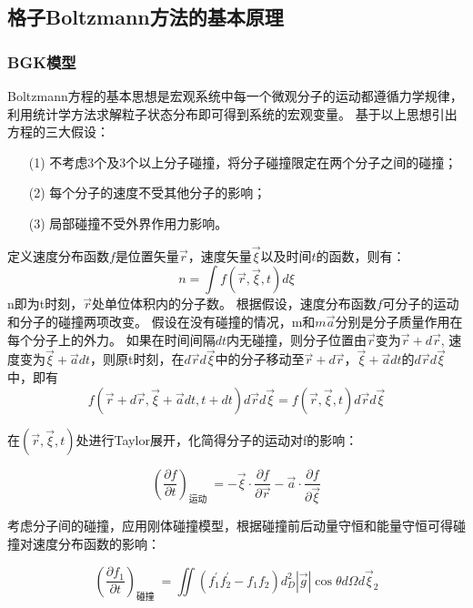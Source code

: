\subsection{格子Boltzmann方法的基本原理}

\subsubsection{BGK模型}
Boltzmann方程的基本思想是宏观系统中每一个微观分子的运动都遵循力学规律，
利用统计学方法求解粒子状态分布即可得到系统的宏观变量。
基于以上思想引出方程的三大假设：
\begin{itemize}
	\item[(1)] 不考虑3个及3个以上分子碰撞，将分子碰撞限定在两个分子之间的碰撞；
	\item[(2)] 每个分子的速度不受其他分子的影响；
	\item[(3)] 局部碰撞不受外界作用力影响。	
\end{itemize}

定义速度分布函数$f$是位置矢量$\vec{r}$，速度矢量$\vec{\xi}$以及时间$t$的函数，则有：
\begin{equation}n=\int f(\vec{r}, \vec{\xi}, t) d \xi\end{equation}
\noindent n即为t时刻，$\vec{r}$处单位体积内的分子数。
根据假设，速度分布函数$f$可分子的运动和分子的碰撞两项改变。
假设在没有碰撞的情况，m和$m \vec{a}$分别是分子质量作用在每个分子上的外力。
如果在时间间隔$d t$内无碰撞，则分子位置由$\vec{r}$变为$\vec{r}+d \vec{r}$,
速度变为$\vec{\xi}+\vec{a} d t$，则原t时刻，在$d \vec{r} d \vec{\xi}$中的分子移动至$\vec{r}+d \vec{r}$，$\vec{\xi}+\vec{a} d t$的$d \vec{r} d \vec{\xi}$中，即有
\begin{equation}f(\vec{r}+d \vec{r}, \vec{\xi}+\vec{a} d t, t+d t) d \vec{r} d \vec{\xi}=f(\vec{r}, \vec{\xi}, t) d \vec{r} d \vec{\xi}\end{equation}

\noindent 在$(\vec{r}, \vec{\xi}, t)$处进行Taylor展开，化简得分子的运动对f的影响：

\begin{equation}
\label{运动}
\left(\frac{\partial f}{\partial t}\right)_{\text {运动 }}=-\vec{\xi} \cdot \frac{\partial f}{\partial \vec{r}}-\vec{a} \cdot \frac{\partial f}{\partial \vec{\xi}}\end{equation}

\noindent 考虑分子间的碰撞，应用刚体碰撞模型，根据碰撞前后动量守恒和能量守恒可得碰撞对速度分布函数的影响：

\begin{equation}
\label{碰撞}
\left(\frac{\partial f_{1}}{\partial t}\right)_{\text {碰撞 }}=\iint\left(f_{1}^{\prime} f_{2}^{\prime}-f_{1} f_{2}\right) d_{D}^{2}|\vec{g}| \cos \theta d \Omega d \vec{\xi}_{2}\end{equation}

